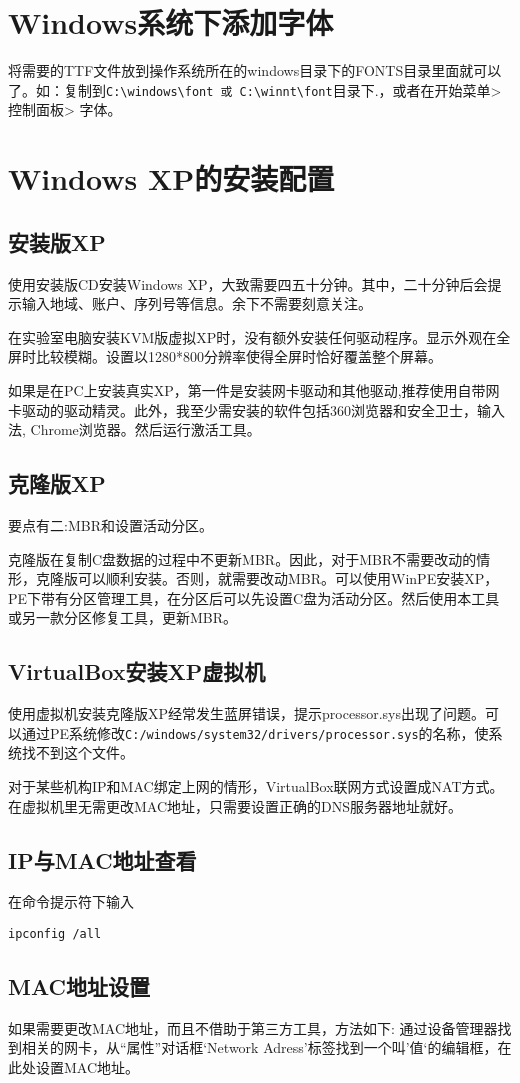 \section{Windows系统下添加字体}
将需要的TTF文件放到操作系统所在的windows目录下的FONTS目录里面就可以了。如：复制到\verb+C:\windows\font 或 C:\winnt\font+目录下.，或者在开始菜单> 控制面板> 字体。
\section{Windows XP的安装配置}

\subsection{安装版XP}
使用安装版CD安装Windows XP，大致需要四五十分钟。其中，二十分钟后会提示输入地域、账户、序列号等信息。余下不需要刻意关注。

在实验室电脑安装KVM版虚拟XP时，没有额外安装任何驱动程序。显示外观在全屏时比较模糊。设置以1280*800分辨率使得全屏时恰好覆盖整个屏幕。

如果是在PC上安装真实XP，第一件是安装网卡驱动和其他驱动,推荐使用自带网卡驱动的驱动精灵。此外，我至少需安装的软件包括360浏览器和安全卫士，输入法, Chrome浏览器。然后运行激活工具。

\subsection{克隆版XP}
要点有二:MBR和设置活动分区。

克隆版在复制C盘数据的过程中不更新MBR。因此，对于MBR不需要改动的情形，克隆版可以顺利安装。否则，就需要改动MBR。可以使用WinPE安装XP，PE下带有分区管理工具，在分区后可以先设置C盘为活动分区。然后使用本工具或另一款分区修复工具，更新MBR。

\subsection{VirtualBox安装XP虚拟机}
使用虚拟机安装克隆版XP经常发生蓝屏错误，提示processor.sys出现了问题。可以通过PE系统修改\verb+C:/windows/system32/drivers/processor.sys+的名称，使系统找不到这个文件。

对于某些机构IP和MAC绑定上网的情形，VirtualBox联网方式设置成NAT方式。在虚拟机里无需更改MAC地址，只需要设置正确的DNS服务器地址就好。

\subsection{IP与MAC地址查看}
在命令提示符下输入
\begin{verbatim}
ipconfig /all
\end{verbatim}

\subsection{MAC地址设置}
如果需要更改MAC地址，而且不借助于第三方工具，方法如下:
通过设备管理器找到相关的网卡，从``属性''对话框‘Network Adress’标签找到一个叫’值‘的编辑框，在此处设置MAC地址。

